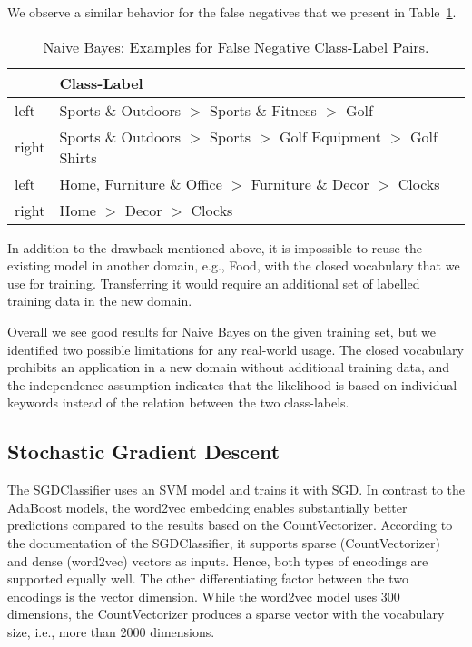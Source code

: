 We observe a similar behavior for the false negatives that we present in Table~\ref{tab:naive-bayes-fn}.
\begin{table}[htbp]
    \begin{center}
        \begin{tabularx}{\textwidth}{lX}
            & Class-Label \\
            \hline
            left & Sports \& Outdoors $>$ Sports \& Fitness $>$ Golf \\
            right & Sports \& Outdoors $>$ Sports $>$ Golf Equipment $>$ Golf Shirts \\
            \hline
            left & Home, Furniture \& Office $>$ Furniture \& Decor $>$ Clocks \\
            right & Home $>$ Decor $>$ Clocks \\
        \end{tabularx}
        \caption{Naive Bayes: Examples for False Negative Class-Label Pairs.}
        \label{tab:naive-bayes-fn}
    \end{center}
\end{table}

In addition to the drawback mentioned above, it is impossible
to reuse the existing model in another domain, e.g., Food, with the closed vocabulary that we use for training.
Transferring it would require an additional set of labelled training data in the new domain.

Overall we see good results for Naive Bayes on the given training set, but we identified two possible limitations for
any real-world usage.
The closed vocabulary prohibits an application in a new domain without additional training data, and the independence
assumption indicates that the likelihood is based on individual keywords instead of the relation between the two
class-labels.

\subsection{Stochastic Gradient Descent}

The  SGDClassifier uses an SVM model and trains it with SGD\@.
In contrast to the AdaBoost models, the word2vec embedding enables substantially better predictions compared to the
results based on the CountVectorizer.
According to the documentation of the SGDClassifier, it supports sparse (CountVectorizer) and dense (word2vec)
vectors as inputs.
Hence, both types of encodings are supported equally well.
The other differentiating factor between the two encodings is the vector dimension.
While the word2vec model uses 300 dimensions, the CountVectorizer produces a sparse vector with the vocabulary size,
i.e., more than 2000 dimensions.

